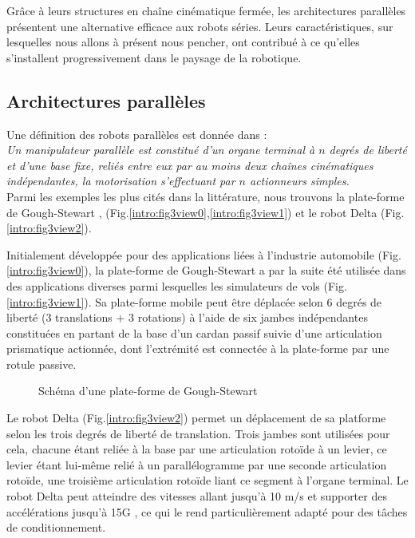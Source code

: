Grâce à leurs structures en cha\^ine cin\'ematique ferm\'ee, les 
architectures parallèles pr\'esentent une alternative efficace aux robots 
s\'eries.  Leurs caractéristiques, sur lesquel\-les nous allons \`a 
pr\'esent nous pencher, ont contribué à ce qu'elles s'installent 
progressivement dans le paysage de la robotique.

\subsection{Architectures parallèles} \label{chap0-0-2}

Une définition des robots parallèles est donnée dans \cite{merlet1997robots} :\\
{\it Un manipulateur parallèle est constitué d’un organe terminal à $n$ degrés 
de li\-berté et d’une base fixe, reliés entre eux par au moins deux chaînes
cinématiques indépendantes, la motorisation s’effectuant par $n$ actionneurs 
simples.}\\

Parmi les exemples les plus cités dans la littérature, nous trouvons 
la plate-forme de Gough-Stewart \cite{1956:Gough}, \cite{1965:Stewart} 
(Fig.\ref{intro:fig3view0},\ref{intro:fig3view1}) et le robot Delta 
\cite{1988:Clavel} (Fig.\ref{intro:fig3view2}).

Initialement développée pour des applications li\'ees \`a l'industrie 
automobile (Fig.\ref{intro:fig3view0}), la plate-forme de Gough-Stewart a par 
la suite été utilisée dans des applications diverses parmi lesquelles les 
simulateurs de vols (Fig.\ref{intro:fig3view1}). Sa plate-forme mobile peut 
être déplacée selon 6 degrés de liberté (3 translations $+$ 3 rotations) à 
l'aide de six jambes indépendantes constitu\'ees en partant de la 
base d'un cardan passif suivie d'une articulation prismatique 
actionn\'ee, dont l'extr\'emit\'e est connect\'ee \`a la plate-forme 
par une rotule passive.

\begin{figure}[!ht]
  \centering
\def\svgwidth{.85\linewidth}

    \caption{\footnotesize{Sch\'ema d'une plate-forme de Gough-Stewart}}
\label{intro:fig2b}
\end{figure}

Le robot Delta (Fig.\ref{intro:fig3view2}) permet un déplacement de sa 
platforme selon les trois degrés de liberté de translation. Trois jambes sont 
utilisées pour cela, chacune étant reliée à la base par une articulation rotoïde 
à un levier, ce levier étant lui-même relié à un parallélogramme par une 
seconde articulation rotoïde, une troisième articulation rotoïde liant ce 
segment à l'organe terminal. Le robot Delta peut atteindre des vitesses allant 
jusqu'à 10 m/s et supporter des accélérations jusqu'à 15G \cite{park2013}, ce 
qui le rend particulièrement adapté pour des tâches de conditionnement.

